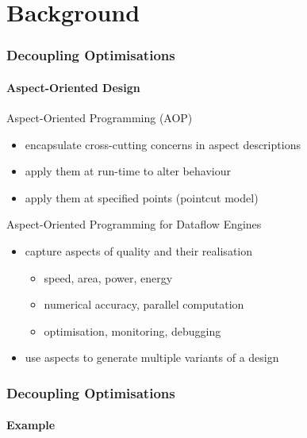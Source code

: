 \section{Background}

\begin{frame}[fragile]
  \frametitle{Decoupling Optimisations}
  \framesubtitle{Aspect-Oriented Design}
  \begin{beamerboxesrounded}{Aspect-Oriented Programming (AOP)}
    \begin{itemize}
      \item encapsulate cross-cutting concerns in aspect descriptions
      \item apply them at run-time to alter behaviour
      \item apply them at specified points (pointcut model)
    \end{itemize}
  \end{beamerboxesrounded}
  \vspace{0.75cm}
  \begin{beamerboxesrounded}{Aspect-Oriented Programming for Dataflow Engines}
    \begin{itemize}
      \item capture aspects of quality and their realisation
        \begin{itemize}
          \item speed, area, power, energy
          \item numerical accuracy, parallel computation
          \item optimisation, monitoring, debugging
        \end{itemize}
      \item use aspects to generate multiple variants of a design
    \end{itemize}
  \end{beamerboxesrounded}


\end{frame}

\begin{frame}[fragile]
  \frametitle{Decoupling Optimisations}
  \framesubtitle{Example}
  \begin{figure}[!ht]
  \centering
  \def\svgwidth{\textwidth}
  
\end{figure}
\end{frame}
